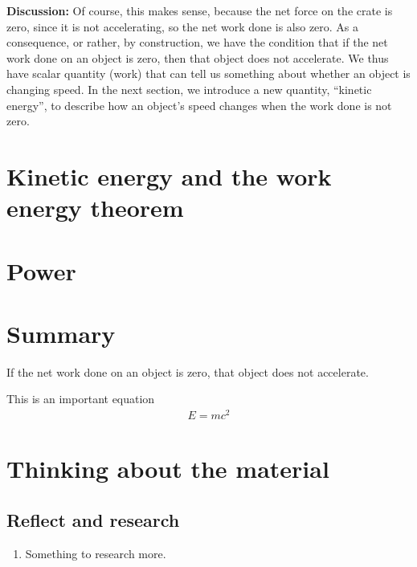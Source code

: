 \begin{example}
\textbf{Discussion:} Of course, this makes sense, because the net force on the crate is zero, since it is not accelerating, so the net work done is also zero. As a consequence, or rather, by construction, we have the condition that if the net work done on an object is zero, then that object does not accelerate. We thus have scalar quantity (work) that can tell us something about whether an object is changing speed. In the next section, we introduce a new quantity, ``kinetic energy'', to describe how an object's speed changes when the work done is not zero.
\end{example}

\section{Kinetic energy and the work energy theorem}

\section{Power}


\newpage
\section{Summary}

\begin{chapterSummary}{
\item If the net work done on an object is zero, that object does not accelerate.
}
\end{chapterSummary}

\newpage
\begin{importantEquations}
This is an important equation
\begin{align*}
E = mc^2
\end{align*}

\end{importantEquations}


\newpage
\section{Thinking about the material}
\subsection{Reflect and research}

\begin{enumerate}
\item Something to research more.
\end{enumerate}

